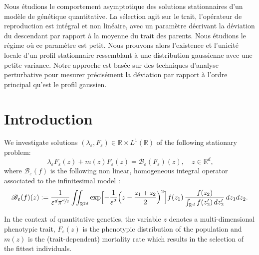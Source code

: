 \documentclass[JEP,XML,SOM,Unicode]{cedram}
\let\mathcal\mathscr
\newcommand{\cB}{\mathcal{B}}
\theoremstyle{plain}
\theoremstyle{definition}
\newcommand{\RR}{\mathbb{R}}\let\R\RR
\let\eps\varepsilon
\begin{document}


\begin{altabstract}
Nous étudions le comportement asymptotique des solutions stationnaires d'un modèle de génétique quantitative. La sélection agit sur le trait, l'opérateur de reproduction est intégral et non linéaire, avec un paramètre décrivant la déviation du descendant par rapport à la moyenne du trait des parents. Nous étudions le régime où ce paramètre est petit. Nous prouvons alors l'existence et l'unicité locale d'un profil stationnaire ressemblant à une distribution gaussienne avec une petite variance. Notre approche est basée sur des techniques d'analyse perturbative pour mesurer précisément la déviation par rapport à l'ordre principal qu'est le profil gaussien.
\end{altabstract}

\maketitle
\tableofcontents


\vspace*{-\baselineskip}\vskip0pt
\section{Introduction}
We investigate solutions $(\lambda_\eps,F_\eps) \in \R\times L^1(\R)$ of the following stationary problem:
\begin{equation}\label{eq:main_fep}\tag{$PF_\eps$}
\ \lambda_\eps F_\eps(z) + m(z) F_\eps(z) = \cB_\eps (F_\eps)(z), \quad z\in \R^d ,
\end{equation}
where $\cB_\eps (f)$ is the following non linear, homogeneous integral operator associated to the infinitesimal model \cite{Fisher1918,weberinfinitesimal}:
\begin{equation}
\cB_\eps (f)(z):= \dfrac{1}{\eps^d \pi^{\sfrac d2}} \iint_{\RR^{2d}} \exp\Bigl[ - \dfrac{1}{\eps^2} \Bigl(z - \dfrac{z_1 + z_2}2 \Bigr)^2 \Bigr ] f(z_1)\,\dfrac{f(z_2)}{ \int_{\R^d} f(z_2')\, d z_2'}\, d z_1 d z_2.\label{eq:Beps}
\end{equation}

In the context of quantitative genetics, the variable $z$ denotes a multi-dimensional phenotypic trait, $F_\eps(z)$ is the phenotypic distribution of the population and $m(z)$ is the (trait-dependent) mortality rate which results in the selection of the fittest individuals.
\end{document}
